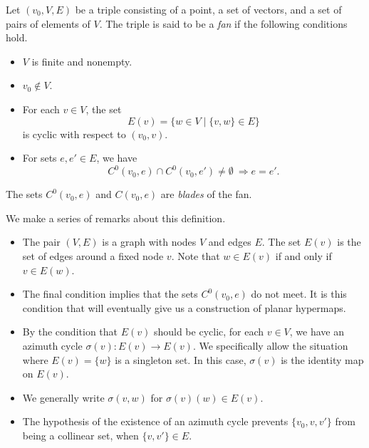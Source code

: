 
\begin{definition}  Let $(v_0,V,E)$ be a triple consisting of a point,
a set of
vectors, and a set of pairs of elements of $V$.  The triple is said to be
a {\it fan\/} if the following conditions hold.
    \begin{itemize}
    \item $V$ is finite and nonempty.
    \item $v_0\not\in V$.
    \item For each $v\in V$, the set
        $$
        E(v) = \{w\in V\mid \{v,w\}\in E\}
        $$
        is cyclic with respect to $(v_0,v)$.
    \item For sets $e,e'\in E$,   we have
        $$C^0(v_0,e) \cap C^0(v_0,e')\ne\emptyset\ \Rightarrow e = e'.$$
    \end{itemize}
The sets $C^0(v_0,e)$ and $C(v_0,e)$ are {\it blades\/} of the fan.
\end{definition}

We make a series of remarks about this definition.

\begin{remark}
\begin{itemize}
\item The pair $(V,E)$ is a graph with nodes $V$ and edges $E$.  The set
$E(v)$ is the set of edges around a fixed node $v$.
Note that $w\in E(v)$ if and only if $v\in E(w)$.   
%
\item The final condition implies that the sets $C^0(v_0,e)$
do not meet.   It
is this condition that will eventually give us a construction of planar
hypermaps.
%
\item
By the condition that $E(v)$ should be cyclic,
for each $v\in V$, we have an azimuth cycle $\sigma(v):E(v)\to E(v)$.
We specifically allow the situation where $E(v) = \{w\}$ is a
singleton set. In this case,
$\sigma(v)$ is the identity map on $E(v)$.
%
\item
We generally write $\sigma(v,w)$ for $\sigma(v)(w)\in E(v)$.
%
\item 
The hypothesis of the existence of an azimuth cycle
prevents $\{v_0,v,v'\}$ from being a collinear set, when $\{v,v'\}\in
E$.
%
\end{itemize}
\end{remark}



